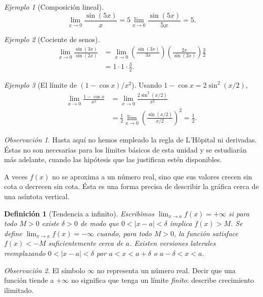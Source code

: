 \documentclass[12pt]{article}
\newtheorem{definicion}{Definición}[section]
\theoremstyle{remark}
\newtheorem{observacion}{Observación}
\newtheorem{ejemplo}{Ejemplo}
\begin{document}
\begin{ejemplo}[Composición lineal]
\[
 \lim_{x\to0}\frac{\sin(5x)}{x}=
 5\lim_{x\to0}\frac{\sin(5x)}{5x}=\boxed{5}.
\]
\end{ejemplo}
\begin{ejemplo}[Cociente de senos]
\begin{align*}
\lim_{x\to0}\frac{\sin(3x)}{\sin(2x)}
 &=\lim_{x\to0}\left(\frac{\sin(3x)}{3x}\right)
 \left(\frac{2x}{\sin(2x)}\right)\frac32\\
 &=1\cdot1\cdot\boxed{\frac32}.
\end{align*}
\end{ejemplo}
\begin{ejemplo}[El límite de $(1-\cos x)/x^2$]
Usando $1-\cos x=2\sin^2(x/2)$,
\begin{align*}
 \lim_{x\to0}\frac{1-\cos x}{x^2}
 &=\lim_{x\to0}\frac{2\sin^2(x/2)}{x^2}\\
 &=\frac12\lim_{x\to0}\left(\frac{\sin(x/2)}{x/2}\right)^2
 =\boxed{\frac12}.
\end{align*}
\end{ejemplo}

\begin{observacion}
Hasta aquí no hemos empleado la regla de L'Hôpital ni derivadas. Éstas no son necesarias para los límites básicos de esta unidad y se estudiarán más adelante, cuando las hipótesis que las justifican estén disponibles.
\end{observacion}
A veces $f(x)$ no se aproxima a un número real, sino que sus valores crecen sin cota o decrecen sin cota. Ésta es una forma precisa de describir la gráfica cerca de una asíntota vertical.

\begin{definicion}[Tendencia a infinito]
Escribimos $\lim_{x\to a}f(x)=+\infty$ si para todo $M>0$ existe $\delta>0$ de modo que $0<|x-a|<\delta$ implica $f(x)>M$. Se define $\lim_{x\to a}f(x)=-\infty$ cuando, para todo $M>0$, la función satisface $f(x)<-M$ suficientemente cerca de $a$. Existen versiones laterales reemplazando $0<|x-a|<\delta$ por $a<x<a+\delta$ o $a-\delta<x<a$.
\end{definicion}

\begin{observacion}
El símbolo $\infty$ no representa un número real. Decir que una función tiende a $+\infty$ no significa que tenga un límite \emph{finito}: describe crecimiento ilimitado.
\end{observacion}
\end{document}
